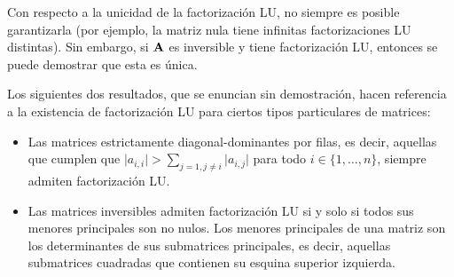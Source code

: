 Con respecto a la unicidad de la factorización LU, no siempre es posible
garantizarla (por ejemplo, la matriz nula tiene infinitas factorizaciones
LU distintas). Sin embargo, si $\mathbf{A}$ es inversible y tiene factorización
LU, entonces se puede demostrar que esta es única.

Los siguientes dos resultados, que se enuncian sin demostración, hacen
referencia a la existencia de factorización LU para ciertos tipos particulares
de matrices:
\begin{itemize}
\item Las matrices estrictamente diagonal-dominantes por filas, es decir,
    aquellas que cumplen que $\vert a_{i,i} \vert > \sum_{j=1, j \neq i}
    \vert a_{i,j}\vert$ para todo $i \in \{1,\dots,n\}$, siempre admiten
    factorización LU.
\item Las matrices inversibles admiten factorización LU si y solo si todos
    sus menores principales son no nulos. Los menores principales de una
    matriz son los determinantes de sus submatrices principales, es decir,
    aquellas submatrices cuadradas que contienen su esquina superior
    izquierda.
\end{itemize}
